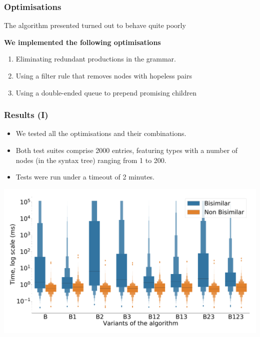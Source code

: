 \documentclass[10pt]{beamer}
\begin{document}
\begin{frame}
  \frametitle{Optimisations}
  The algorithm presented turned out to behave quite poorly
  
  \textbf{We implemented the following optimisations}
  \begin{enumerate}
  \item Eliminating redundant productions in the grammar.
  \item Using a filter rule that removes nodes with hopeless pairs
  \item Using a double-ended queue to prepend promising children
  \end{enumerate}
\end{frame}

\begin{frame}
  \frametitle{Results (I)}
  \begin{itemize}
  \item We tested all the optimisations and their combinations.
  \item Both test suites comprise 2000 entries, featuring types with a number of
    nodes (in the syntax tree) ranging from 1 to 200.
  \item Tests were run under a timeout of 2 minutes.
  \end{itemize}
  \pause
  \includegraphics[scale=0.20]{img/distribution_boxplot.pdf}
\end{frame}
\end{document}
